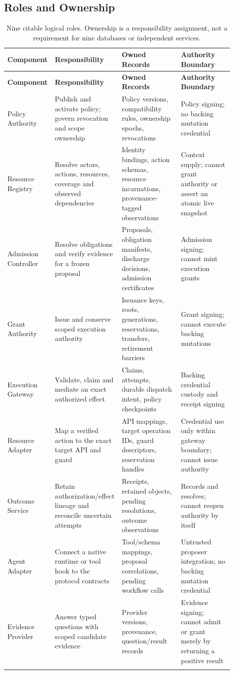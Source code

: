 \subsection{Roles and Ownership}
\small
\begin{longtable}{L{0.20\linewidth}L{0.22\linewidth}L{0.26\linewidth}L{0.23\linewidth}}
\toprule
\textbf{Component} & \textbf{Responsibility} & \textbf{Owned Records} & \textbf{Authority Boundary}\\
\midrule
\endfirsthead
\toprule
\textbf{Component} & \textbf{Responsibility} & \textbf{Owned Records} & \textbf{Authority Boundary}\\
\midrule
\endhead
Policy Authority & Publish and activate policy; govern revocation and scope ownership & Policy versions, compatibility rules, ownership epochs, revocations & Policy signing; no backing mutation credential\\
Resource Registry & Resolve actors, actions, resources, coverage and observed dependencies & Identity bindings, action schemas, resource incarnations, provenance-tagged observations & Context supply; cannot grant authority or assert an atomic live snapshot\\
Admission Controller & Resolve obligations and verify evidence for a frozen proposal & Proposals, obligation manifests, discharge decisions, admission certificates & Admission signing; cannot mint execution grants\\
Grant Authority & Issue and conserve scoped execution authority & Issuance keys, roots, generations, reservations, transfers, retirement barriers & Grant signing; cannot execute backing mutations\\
Execution Gateway & Validate, claim and mediate an exact authorized effect & Claims, attempts, durable dispatch intent, policy checkpoints & Backing credential custody and receipt signing\\
Resource Adapter & Map a verified action to the exact target API and guard & API mappings, target operation IDs, guard descriptors, reservation handles & Credential use only within gateway boundary; cannot issue authority\\
Outcome Service & Retain authorization/effect lineage and reconcile uncertain attempts & Receipts, retained objects, pending resolutions, outcome observations & Records and resolves; cannot reopen authority by itself\\
Agent Adapter & Connect a native runtime or tool hook to the protocol contracts & Tool/schema mappings, proposal correlations, pending workflow calls & Untrusted proposer integration; no backing mutation credential\\
Evidence Provider & Answer typed questions with scoped candidate evidence & Provider versions, provenance, question/result records & Evidence signing; cannot admit or grant merely by returning a positive result\\
\bottomrule
\caption{Nine citable logical roles. Ownership is a responsibility assignment, not a requirement for nine databases or independent services.}
\label{tab:component-catalog}
\end{longtable}
\normalsize


